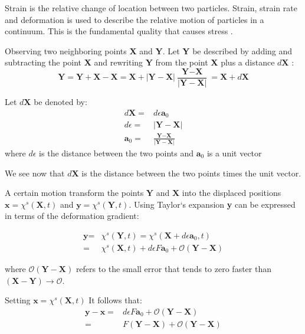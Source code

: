 Strain is the relative change of location between two particles. Strain, strain rate and deformation is used to describe the relative motion of particles in a continuum. This is the fundamental quality that causes stress \cite{Richter2010}.

Observing two neighboring points \textbf{X} and \textbf{Y}. Let \textbf{Y} be described by adding and subtracting the point \textbf{X} and rewriting \textbf{Y} from the point \textbf{X} plus a distance $d\textbf{X}$   :
\begin{equation}
\textbf{Y} = \textbf{Y} + \textbf{X} - \textbf{X} = \textbf{X} + |\textbf{Y} - \textbf{X}| \frac{\textbf{Y} - \textbf{X}}{|\textbf{Y} - \textbf{X}|} = \textbf{X} + d\textbf{X}
\end{equation}

Let $d\textbf{X}$ be denoted by:
\begin{align}
d\textbf{X} =& d\epsilon \textbf{a}_0\\
d\epsilon =& |\textbf{Y} - \textbf{X}| \\
\textbf{a}_0 =& \frac{\textbf{Y} - \textbf{X}}{|\textbf{Y} - \textbf{X}|}
\end{align}
where $d\epsilon$ is the distance between the two points and $\textbf{a}_0$ is a unit vector 

We see now that $d\textbf{X}$ is the distance between the two points times the unit vector. \newline

A certain motion transform the points $\textbf{Y}$ and $\textbf{X}$ into the displaced positions $\textbf{x} = \chi^s(\textbf{X},t)$ and $\textbf{y} = \chi^s(\textbf{Y},t)$. Using Taylor`s expansion \textbf{y} can be expressed in terms of the deformation gradient:

\begin{align}
\textbf{y} =& \chi^s(\textbf{Y},t) = \chi^s(\textbf{X} + d\epsilon \textbf{a}_0,t) \\
=& \chi^s(\textbf{X},t) + d\epsilon F \textbf{a}_0 + \mathcal{O}(\textbf{Y}-\textbf{X}) 
\end{align}

where $\mathcal{O} (\textbf{Y}-\textbf{X})$ refers to the small error that tends to zero faster than $(\textbf{X} - \textbf{Y}) \rightarrow \mathcal{O}$. \newline

Setting $\textbf{x} = \chi^s(\textbf{X},t)$  It follows that:
\begin{align}
\textbf{y} - \textbf{x} =&  d\epsilon F \textbf{a}_0 + \mathcal{O}(\textbf{Y}-\textbf{X}) \\
=& F(\textbf{Y} - \textbf{X}) + \mathcal{O}(\textbf{Y}-\textbf{X}) 
\end{align}

